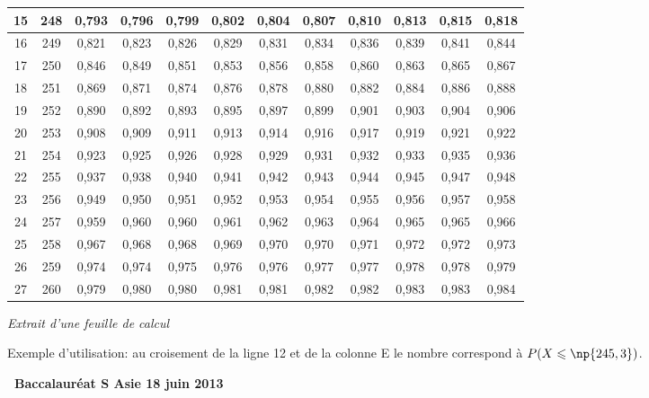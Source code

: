 \documentclass[10pt]{article}
\begin{document}
\begin{center}
\begin{tabular}{|c|c|c|c|c|c|c|c|c|c|c|c|}
15 & 248 & 0,793 & 0,796 & 0,799 & 0,802 & 0,804 & 0,807 & 0,810 & 0,813 & 0,815 & 0,818 \\ \hline
16 & 249 & 0,821 & 0,823 & 0,826 & 0,829 & 0,831 & 0,834 & 0,836 & 0,839 & 0,841 & 0,844 \\ \hline
17 & 250 & 0,846 & 0,849 & 0,851 & 0,853 & 0,856 & 0,858 & 0,860 & 0,863 & 0,865 & 0,867 \\ \hline
18 & 251 & 0,869 & 0,871 & 0,874 & 0,876 & 0,878 & 0,880 & 0,882 & 0,884 & 0,886 & 0,888 \\ \hline
19 & 252 & 0,890 & 0,892 & 0,893 & 0,895 & 0,897 & 0,899 & 0,901 & 0,903 & 0,904 & 0,906 \\ \hline
20 & 253 & 0,908 & 0,909 & 0,911 & 0,913 & 0,914 & 0,916 & 0,917 & 0,919 & 0,921 & 0,922 \\ \hline
21 & 254 & 0,923 & 0,925 & 0,926 & 0,928 & 0,929 & 0,931 & 0,932 & 0,933 & 0,935 & 0,936 \\ \hline
22 & 255 & 0,937 & 0,938 & 0,940 & 0,941 & 0,942 & 0,943 & 0,944 & 0,945 & 0,947 & 0,948 \\ \hline
23 & 256 & 0,949 & 0,950 & 0,951 & 0,952 & 0,953 & 0,954 & 0,955 & 0,956 & 0,957 & 0,958 \\ \hline
24 & 257 & 0,959 & 0,960 & 0,960 & 0,961 & 0,962 & 0,963 & 0,964 & 0,965 & 0,965 & 0,966 \\ \hline
25 & 258 & 0,967 & 0,968 & 0,968 & 0,969 & 0,970 & 0,970 & 0,971 & 0,972 & 0,972 & 0,973 \\ \hline
26 & 259 & 0,974 & 0,974 & 0,975 & 0,976 & 0,976 & 0,977 & 0,977 & 0,978 & 0,978 & 0,979 \\ \hline
27 & 260 & 0,979 & 0,980 & 0,980 & 0,981 & 0,981 & 0,982 & 0,982 & 0,983 & 0,983 & 0,984 \\ \hline
\end{tabular}
\emph{Extrait d'une feuille de calcul}

\end{center}

Exemple d'utilisation: au croisement de la ligne 12 et de la colonne E  le nombre  correspond à $P(X\leqslant \np{245,3})$.
\newpage
\hypertarget{Asie}{}

\renewcommand \footrulewidth{.2pt}
\pagestyle{fancy}
\thispagestyle{empty}

\begin{center}{\Large{\textbf{\decofourleft~Baccalauréat S Asie 
18 juin 2013~\decofourright}}} \end{center}
\end{document}
